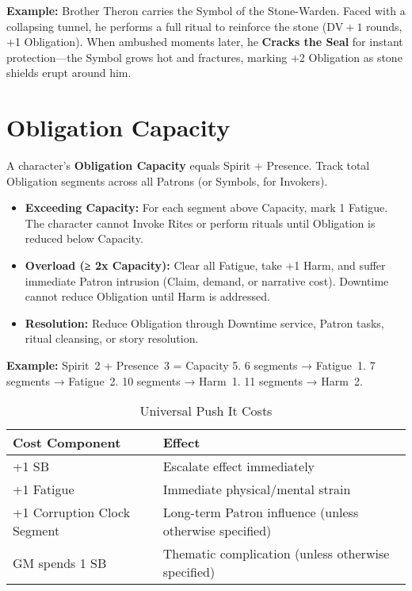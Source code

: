 \textbf{Example:} Brother Theron carries the Symbol of the Stone-Warden. Faced with a collapsing tunnel, he performs a full ritual to reinforce the stone (\(\text{DV} + 1\) rounds, +1 Obligation). When ambushed moments later, he \textbf{Cracks the Seal} for instant protection—the Symbol grows hot and fractures, marking +2 Obligation as stone shields erupt around him.

\section{Obligation Capacity}

A character’s \textbf{Obligation Capacity} equals Spirit + Presence.
Track total Obligation segments across all Patrons (or Symbols, for Invokers).

\begin{itemize}
  \item \textbf{Exceeding Capacity:} For each segment above Capacity, mark 1 Fatigue. The character cannot Invoke Rites or perform rituals until Obligation is reduced below Capacity.
  \item \textbf{Overload (≥ 2x Capacity):} Clear all Fatigue, take +1 Harm, and suffer immediate Patron intrusion (Claim, demand, or narrative cost). Downtime cannot reduce Obligation until Harm is addressed.
  \item \textbf{Resolution:} Reduce Obligation through Downtime service, Patron tasks, ritual cleansing, or story resolution.
\end{itemize}

\textbf{Example:} Spirit~2 + Presence~3 = Capacity 5.
6 segments → Fatigue~1.
7 segments → Fatigue~2.
10 segments → Harm~1.
11 segments → Harm~2.

\begin{table}[h]
\centering
\caption{Universal Push It Costs}
\begin{tabular}{|l|l|}
\hline
\textbf{Cost Component} & \textbf{Effect} \\
\hline
+1 SB & Escalate effect immediately \\
+1 Fatigue & Immediate physical/mental strain \\
+1 Corruption Clock Segment & Long-term Patron influence (unless otherwise specified) \\
GM spends 1 SB & Thematic complication (unless otherwise specified) \\
\hline
\end{tabular}
\end{table}

